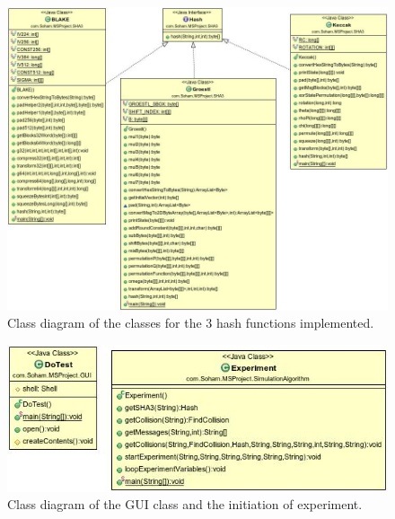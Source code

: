 \begin{figure}
  \begin{center}
    \includegraphics[width=7in]{SHA3classes.jpg}
  \end{center}
  \caption{Class diagram of the classes for the 3 hash functions implemented.}
  \label{fig:UMLSHA3classes}
\end{figure}

\begin{figure}
  \begin{center}
    \includegraphics[width=5.65in]{ExperimentGUIClass.jpg}
  \end{center}
  \caption{Class diagram of the GUI class and the initiation of experiment.}
  \label{fig:UMLExperimentGUIClass}
\end{figure}

